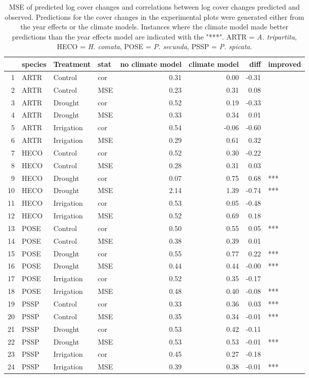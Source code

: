 \begin{table}[H]
\centering
\caption{MSE of predicted log cover changes and correlations between log cover changes predicted and observed. Predictions for the cover changes in the experimental plots were generated either from the year effects or the climate models. Instances where the climate model made better predictions than the year effects model are indicated with the "***". ARTR = \textit{A. tripartita}, HECO = \textit{H. comata}, POSE = \textit{P. secunda}, PSSP = \textit{P. spicata}.} 
\label{table:corPGR}
\begin{tabular}{rlllrrrl}
  \hline
 & species & Treatment & stat & no climate model & climate model & diff & improved \\ 
  \hline
1 & ARTR & Control & cor & 0.31 & 0.00 & -0.31 &  \\ 
  2 & ARTR & Control & MSE & 0.23 & 0.31 & 0.08 &  \\ 
  3 & ARTR & Drought & cor & 0.52 & 0.19 & -0.33 &  \\ 
  4 & ARTR & Drought & MSE & 0.33 & 0.34 & 0.01 &  \\ 
  5 & ARTR & Irrigation & cor & 0.54 & -0.06 & -0.60 &  \\ 
  6 & ARTR & Irrigation & MSE & 0.29 & 0.61 & 0.32 &  \\ 
  7 & HECO & Control & cor & 0.52 & 0.30 & -0.22 &  \\ 
  8 & HECO & Control & MSE & 0.28 & 0.31 & 0.03 &  \\ 
  9 & HECO & Drought & cor & 0.07 & 0.75 & 0.68 & *** \\ 
  10 & HECO & Drought & MSE & 2.14 & 1.39 & -0.74 & *** \\ 
  11 & HECO & Irrigation & cor & 0.53 & 0.05 & -0.48 &  \\ 
  12 & HECO & Irrigation & MSE & 0.52 & 0.69 & 0.18 &  \\ 
  13 & POSE & Control & cor & 0.50 & 0.55 & 0.05 & *** \\ 
  14 & POSE & Control & MSE & 0.38 & 0.39 & 0.01 &  \\ 
  15 & POSE & Drought & cor & 0.55 & 0.77 & 0.22 & *** \\ 
  16 & POSE & Drought & MSE & 0.44 & 0.44 & -0.00 & *** \\ 
  17 & POSE & Irrigation & cor & 0.52 & 0.35 & -0.17 &  \\ 
  18 & POSE & Irrigation & MSE & 0.48 & 0.40 & -0.08 & *** \\ 
  19 & PSSP & Control & cor & 0.33 & 0.36 & 0.03 & *** \\ 
  20 & PSSP & Control & MSE & 0.35 & 0.34 & -0.01 & *** \\ 
  21 & PSSP & Drought & cor & 0.53 & 0.42 & -0.11 &  \\ 
  22 & PSSP & Drought & MSE & 0.53 & 0.53 & -0.01 & *** \\ 
  23 & PSSP & Irrigation & cor & 0.45 & 0.27 & -0.18 &  \\ 
  24 & PSSP & Irrigation & MSE & 0.39 & 0.38 & -0.01 & *** \\ 
   \hline
\end{tabular}
\end{table}
